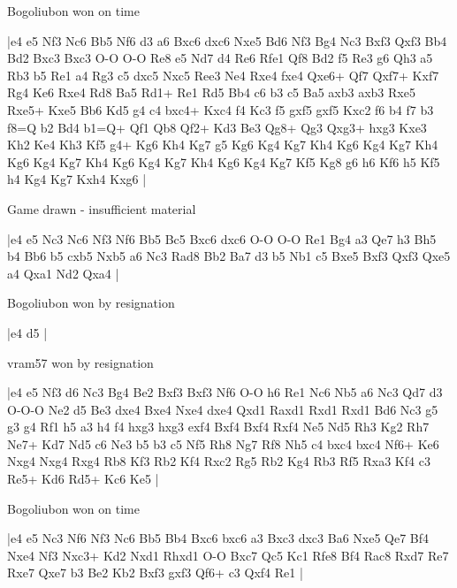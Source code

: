 \showboard

Bogoliubon won on time

\makegametitle
|e4 e5 Nf3 Nc6 Bb5 Nf6 d3 a6 Bxc6 dxc6 Nxe5 Bd6 Nf3 Bg4 Nc3 Bxf3 Qxf3 Bb4 Bd2 Bxc3 Bxc3 O-O O-O Re8 e5 Nd7 d4 Re6 Rfe1 Qf8 Bd2 f5 Re3 g6 Qh3 a5 Rb3 b5 Re1 a4 Rg3 c5 dxc5 Nxc5 Ree3 Ne4 Rxe4 fxe4 Qxe6+ Qf7 Qxf7+ Kxf7 Rg4 Ke6 Rxe4 Rd8 Ba5 Rd1+ Re1 Rd5 Bb4 c6 b3 c5 Ba5 axb3 axb3 Rxe5 Rxe5+ Kxe5 Bb6 Kd5 g4 c4 bxc4+ Kxc4 f4 Kc3 f5 gxf5 gxf5 Kxc2 f6 b4 f7 b3 f8=Q b2 Bd4 b1=Q+ Qf1 Qb8 Qf2+ Kd3 Be3 Qg8+ Qg3 Qxg3+ hxg3 Kxe3 Kh2 Ke4 Kh3 Kf5 g4+ Kg6 Kh4 Kg7 g5 Kg6 Kg4 Kg7 Kh4 Kg6 Kg4 Kg7 Kh4 Kg6 Kg4 Kg7 Kh4 Kg6 Kg4 Kg7 Kh4 Kg6 Kg4 Kg7 Kf5 Kg8 g6 h6 Kf6 h5 Kf5 h4 Kg4 Kg7 Kxh4 Kxg6  |

\showboard

Game drawn - insufficient material

\makegametitle
|e4 e5 Nc3 Nc6 Nf3 Nf6 Bb5 Bc5 Bxc6 dxc6 O-O O-O Re1 Bg4 a3 Qe7 h3 Bh5 b4 Bb6 b5 cxb5 Nxb5 a6 Nc3 Rad8 Bb2 Ba7 d3 b5 Nb1 c5 Bxe5 Bxf3 Qxf3 Qxe5 a4 Qxa1 Nd2 Qxa4  |

\showboard

Bogoliubon won by resignation

\makegametitle
|e4 d5  |

\showboard

vram57 won by resignation

\makegametitle
|e4 e5 Nf3 d6 Nc3 Bg4 Be2 Bxf3 Bxf3 Nf6 O-O h6 Re1 Nc6 Nb5 a6 Nc3 Qd7 d3 O-O-O Ne2 d5 Be3 dxe4 Bxe4 Nxe4 dxe4 Qxd1 Raxd1 Rxd1 Rxd1 Bd6 Nc3 g5 g3 g4 Rf1 h5 a3 h4 f4 hxg3 hxg3 exf4 Bxf4 Bxf4 Rxf4 Ne5 Nd5 Rh3 Kg2 Rh7 Ne7+ Kd7 Nd5 c6 Ne3 b5 b3 c5 Nf5 Rh8 Ng7 Rf8 Nh5 c4 bxc4 bxc4 Nf6+ Ke6 Nxg4 Nxg4 Rxg4 Rb8 Kf3 Rb2 Kf4 Rxc2 Rg5 Rb2 Kg4 Rb3 Rf5 Rxa3 Kf4 c3 Re5+ Kd6 Rd5+ Kc6 Ke5  |

\showboard

Bogoliubon won on time

\makegametitle
|e4 e5 Nc3 Nf6 Nf3 Nc6 Bb5 Bb4 Bxc6 bxc6 a3 Bxc3 dxc3 Ba6 Nxe5 Qe7 Bf4 Nxe4 Nf3 Nxc3+ Kd2 Nxd1 Rhxd1 O-O Bxc7 Qc5 Kc1 Rfe8 Bf4 Rac8 Rxd7 Re7 Rxe7 Qxe7 b3 Be2 Kb2 Bxf3 gxf3 Qf6+ c3 Qxf4 Re1  |

